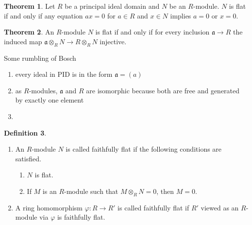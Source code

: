 \documentclass[a4paper]{book}
\theoremstyle{definition}
\newtheorem{definition}{Definition}[]
\newtheorem{theorem}[definition]{Theorem}
\begin{document}
\begin{thmbox}
    \begin{theorem}
        Let \(R\) be a principal ideal domain and \(N\) be an \(R\)-module. \(N\) is flat if and only if any equation \(ax = 0\) for \(a \in R\) and \(x \in N\) implies \(a = 0\) or \(x = 0\).
    \end{theorem}
\end{thmbox}


\begin{thmbox}
    \begin{theorem}
        An \(R\)-module \(N\) is flat if and only if for every inclusion \(\mathfrak{a} \longrightarrow R\) the induced map \(\mathfrak{a} \otimes_R N \longrightarrow R \otimes_R N\) injective.
    \end{theorem}
\end{thmbox}

Some rumbling of Bosch
\begin{enumerate}
    \item every ideal in PID is in the form \(\mathfrak{a} = (a)\)
    \item as \(R\)-modules, \(\mathfrak{a}\) and \(R\) are isomorphic because both are free and generated by exactly one element
    \item 
\end{enumerate}


\newpage
\begin{defbox}
    \begin{definition}
        \begin{enumerate}
        \item An \(R\)-module \(N\) is called faithfully flat if the following conditions are satisfied.
            \begin{enumerate}
                \item \(N\) is flat.
                \item If \(M\) is an \(R\)-module such that \(M \otimes_R N = 0\), then \(M = 0\).
            \end{enumerate}
        \item A ring homomorphism \(\varphi: R \longrightarrow R'\) is called faithfully flat if \(R'\) viewed as an \(R\)-module via \(\varphi\) is faithfully flat.
        \end{enumerate}
    \end{definition}
\end{defbox}
\end{document}
